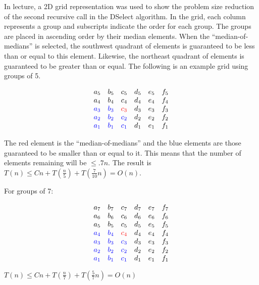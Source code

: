 \documentclass[10pt]{article}
\begin{document}
In lecture, a 2D grid representation was used to show the problem size reduction of the second recursive call in the DSelect algorithm. In the grid, each column represents a group and subscripts indicate the order for each group. The groups are placed in ascending order by their median elements. When the ``median-of-medians'' is selected, the southwest quadrant of elements is guaranteed to be less than or equal to this element. Likewise, the northeast quadrant of elements is guaranteed to be greater than or equal. The following is an example grid using groups of 5.

$$
\begin{matrix}
	a_5 & b_5 & c_5 & d_5 & e_5 & f_5\\
	a_4 & b_4 & c_4 & d_4 & e_4 & f_4\\
	\textcolor{blue}{a_3} & \textcolor{blue}{b_3} & \textcolor{red}{c_3} & d_3 & e_3 & f_3\\
	\textcolor{blue}{a_2} & \textcolor{blue}{b_2} & \textcolor{blue}{c_2} & d_2 & e_2 & f_2\\
	\textcolor{blue}{a_1} & \textcolor{blue}{b_1} & \textcolor{blue}{c_1} & d_1 & e_1 & f_1 
\end{matrix}
$$

The red element is the ``median-of-medians'' and the blue elements are those guaranteed to be smaller than or equal to it. This means that the number of elements remaining will be $\leq .7n$. The result is $T(n) \leq Cn + T(\frac{n}{5}) + T(\frac{7}{10} n) = O(n)$.
\smallskip

For groups of 7:

$$
\begin{matrix}
	a_7 & b_7 & c_7 & d_7 & e_7 & f_7\\
	a_6 & b_6 & c_6 & d_6 & e_6 & f_6\\
	a_5 & b_5 & c_5 & d_5 & e_5 & f_5\\
	\textcolor{blue}{a_4} & \textcolor{blue}{b_4} & \textcolor{red}{c_4} & d_4 & e_4 & f_4\\
	\textcolor{blue}{a_3} & \textcolor{blue}{b_3} & \textcolor{blue}{c_3} & d_3 & e_3 & f_3\\
	\textcolor{blue}{a_2} & \textcolor{blue}{b_2} & \textcolor{blue}{c_2} & d_2 & e_2 & f_2\\
	\textcolor{blue}{a_1} & \textcolor{blue}{b_1} & \textcolor{blue}{c_1} & d_1 & e_1 & f_1 
\end{matrix}
$$

$T(n) \leq Cn + T(\frac{n}{7}) + T(\frac{5}{7} n) = O(n)$
\smallskip
\end{document}
